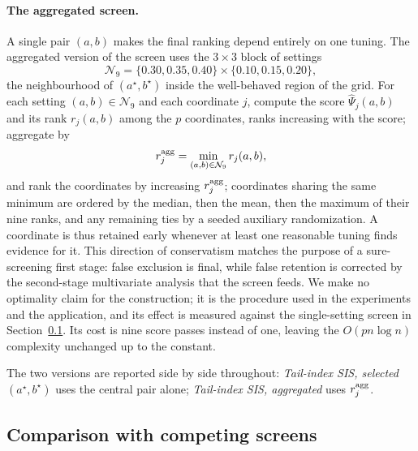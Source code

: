 \documentclass[bj,authoryear]{imsart}
\theoremstyle{plain}
\begin{document}
\paragraph{The aggregated screen.}
A single pair $(a,b)$ makes the final ranking depend entirely on one
tuning. The aggregated version of the screen uses the $3\times3$ block
of settings
\[
 \mathcal N_9=\{0.30,0.35,0.40\}\times\{0.10,0.15,0.20\},
\]
the neighbourhood of $(a^\star,b^\star)$ inside the well-behaved region
of the grid. For each setting $(a,b)\in\mathcal N_9$ and each
coordinate $j$, compute the score $\widehat\Psi_j(a,b)$ and its rank
$r_j(a,b)$ among the $p$ coordinates, ranks increasing with the score;
aggregate by
\[
 r_j^{\rm agg}=\min_{(a,b)\in\mathcal N_9}r_j(a,b),
\]
and rank the coordinates by increasing $r_j^{\rm agg}$; coordinates
sharing the same minimum are ordered by the median, then the mean, then
the maximum of their nine ranks, and any remaining ties by a seeded
auxiliary randomization. A coordinate is thus retained early whenever at least
one reasonable tuning finds evidence for it. This direction of
conservatism matches the purpose of a sure-screening first stage: false
exclusion is final, while false retention is corrected by the
second-stage multivariate analysis that the screen feeds. We make no
optimality claim for the construction; it is the procedure used in the
experiments and the application, and its effect is measured against the
single-setting screen in Section~\ref{sec:comparison}. Its cost is nine
score passes instead of one, leaving the $O(pn\log n)$ complexity
unchanged up to the constant.

The two versions are reported side by side throughout:
\emph{Tail-index SIS, selected $(a^\star,b^\star)$} uses the central
pair alone; \emph{Tail-index SIS, aggregated} uses $r_j^{\rm agg}$.

\subsection{Comparison with competing screens}\label{sec:comparison}
\end{document}
